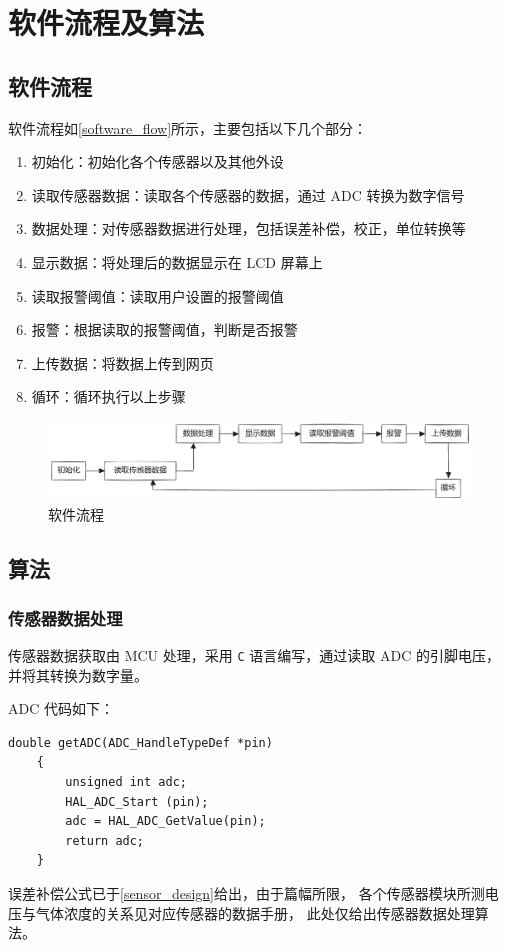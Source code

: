 \documentclass[12pt,hyperref,a4paper,UTF8]{ctexart}
\begin{document}
\newpage
\section{软件流程及算法}
\subsection{软件流程}
软件流程如\autoref{software_flow}所示，主要包括以下几个部分：
\begin{enumerate}
    \item 初始化：初始化各个传感器以及其他外设
    \item 读取传感器数据：读取各个传感器的数据，通过 ADC 转换为数字信号
    \item 数据处理：对传感器数据进行处理，包括误差补偿，校正，单位转换等
    \item 显示数据：将处理后的数据显示在 LCD 屏幕上
    \item 读取报警阈值：读取用户设置的报警阈值
    \item 报警：根据读取的报警阈值，判断是否报警
    \item 上传数据：将数据上传到网页
    \item 循环：循环执行以上步骤
\end{enumerate}

\begin{figure}[htbp]
    \centering
    \includegraphics[width =.8\textwidth]{figures/software_flow.png}
    \caption{软件流程}
    \label{software_flow}
\end{figure}

\subsection{算法}
\subsubsection{传感器数据处理}
传感器数据获取由 MCU 处理，采用 \texttt{C} 语言编写，通过读取 ADC 的引脚电压，并将其转换为数字量。

ADC 代码如下：
\begin{lstlisting}[style=Cstyle]
    double getADC(ADC_HandleTypeDef *pin)
    {
        unsigned int adc;
        HAL_ADC_Start (pin);
        adc = HAL_ADC_GetValue(pin);
        return adc; 
    }
\end{lstlisting}
\newpage
误差补偿公式已于\autoref{sensor_design}给出，由于篇幅所限，
各个传感器模块所测电压与气体浓度的关系见对应传感器的数据手册，
此处仅给出传感器数据处理算法。
\end{document}
